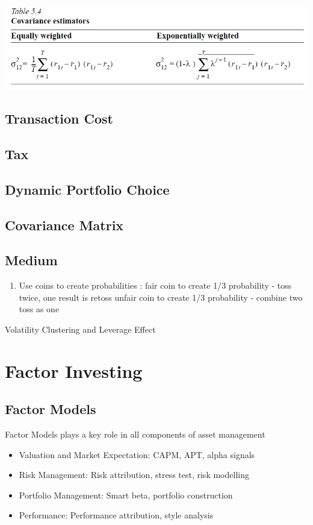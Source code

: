 \documentclass[11pt, openany]{book}              %
\begin{document}
\includegraphics[scale=0.5]{Cov.JPG}

\section{Transaction Cost}
\section{Tax}
\section{Dynamic Portfolio Choice}
\section{Covariance Matrix}




\section{Medium}
\begin{enumerate}
	\item Use coins to create probabilities : fair coin to create 1/3 probability - toss twice, one result is retoss
unfair coin to create 1/3 probability - combine two toss as one


 \end{enumerate}
 



Volatility Clustering and Leverage Effect 

\chapter{Factor Investing}

\section{Factor Models}

Factor Models plays a key role in all components of asset management

\begin{itemize}
	\item Valuation and Market Expectation: CAPM, APT, alpha signals
	\item Risk Management: Risk attribution, stress test, risk modelling
	\item Portfolio Management: Smart beta, portfolio construction
	\item Performance: Performance attribution, style analysis
\end{itemize}
\end{document}

